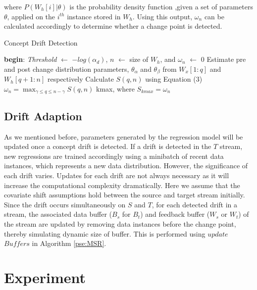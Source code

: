 \documentclass[conference,compsoc]{IEEEtran}
\begin{document}
where $P(W_h[i] | \theta)$ is the probability density function ,given a set of parameters $\theta$, applied on the $i^{th}$ instance stored in $W_h$. Using this output, $\omega_{n}$ can be calculated accordingly to determine whether a change point is detected.

\begin{algorithm}
\caption{Concept Drift Detection}\label{driftdetection}
\begin{algorithmic}[1]
\BState \textbf{begin}:
\State \textit{Threshold} $\gets$ $-log({\alpha}_d)$, $n$ $\gets$ size of $W_h$, 
\State and $\omega_n$ $\gets$ 0
\State Estimate pre and post change distribution 
\State parameters, $\theta_{\alpha}$ and $\theta_{\beta}$ from $W_x[1:q]$ and 
\State $W_h[q+1:n]$ respectively
\State Calculate $S(q,n)$ using Equation (3)
\EndFor
\State $\omega_{n} = \max_{\gamma \leq q \leq n-\gamma}S(q,n)$
\State \Return kmax, where $S_{kmax}=\omega_{n}$
\Else
\State {}
\EndIf
\Else
\State {}
\EndIf
\EndProcedure
\end{algorithmic}
\end{algorithm}
        

\subsection{Drift Adaption}
\label{driftadaption}
As we mentioned before, parameters generated by the regression
model will be updated once a concept drift is detected. If a drift is detected in the $T$ stream, new regressions are trained accordingly using a minibatch of recent data instances, which represents a new data distribution. However, the significance of each drift varies. Updates for each drift are not always necessary as it will increase the computational complexity dramatically. Here we assume that the covariate shift assumptions hold between the source and target stream initially. Since the drift occurs simultaneously on $S$ and $T$, for each detected drift in a stream, the associated data buffer ($B_s$ for $B_t$) and feedback buffer ($W_s$ or $W_t$) of the stream are updated by removing data instances before the change point, thereby simulating dynamic size of buffer. This is performed using $update$$Buffers$ in Algorithm \ref{pse:MSR}.


\section{Experiment}
\end{document}
